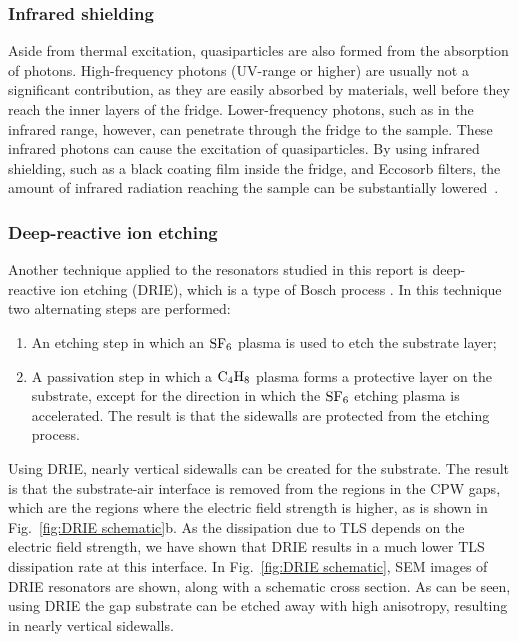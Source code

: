   \subsubsection{Infrared shielding}

  Aside from thermal excitation, quasiparticles are also formed from the absorption of photons. High-frequency photons (UV-range or higher) are usually not a significant contribution, as they are easily absorbed by materials, well before they reach the inner layers of the fridge. Lower-frequency photons, such as in the infrared range, however, can penetrate through the fridge to the sample. These infrared photons can cause the excitation of quasiparticles. By using infrared shielding, such as a black coating film inside the fridge, and Eccosorb filters, the amount of infrared radiation reaching the sample can be substantially lowered~\cite{barends2011minimizing}.



  \subsubsection{Deep-reactive ion etching}

  Another technique applied to the resonators studied in this report is deep-reactive ion etching (DRIE), which is a type of Bosch process \cite{bruno2015reducing}. In this technique two alternating steps are performed:

  \begin{enumerate}
      \item An etching step in which an $\mathrm{SF_6}$ plasma is used to etch the substrate layer;
      \item A passivation step in which a $\mathrm{C_4H_8}$ plasma forms a protective layer on the substrate, except for the direction in which the $\mathrm{SF_6}$ etching plasma is accelerated. The result is that the sidewalls are protected from the etching process.
  \end{enumerate}

  Using DRIE, nearly vertical sidewalls can be created for the substrate. The result is that the substrate-air interface is removed from the regions in the CPW gaps, which are the regions where the electric field strength is higher, as is shown in Fig.~\ref{fig:DRIE schematic}b. As the dissipation due to TLS depends on the electric field strength, we have shown that DRIE results in a much lower TLS dissipation rate at this interface. In Fig.~\ref{fig:DRIE schematic}, SEM images of DRIE resonators are shown, along with a schematic cross section. As can be seen, using DRIE the gap substrate can be etched away with high anisotropy, resulting in nearly vertical sidewalls.


